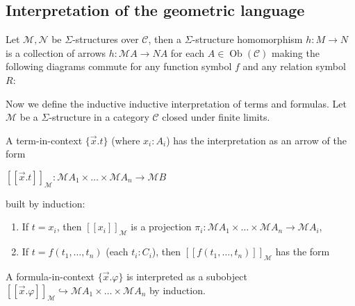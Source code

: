 \documentclass[a4paper]{article}
\theoremstyle{defin}
\theoremstyle{theorem}
\theoremstyle{claim}
\theoremstyle{prop}
\theoremstyle{lemma}
\theoremstyle{fact}
\theoremstyle{ex}
\theoremstyle{col}
\begin{document}
\subsection{Interpretation of the geometric language}

Let $\mathcal{M}, \mathcal{N}$ be $\Sigma$-structures over $\mathcal{C}$, then a $\Sigma$-structure homomorphism $h : M \to N$ is a collection of arrows $h : \mathcal{M} A \to N A$ for each $A \in \operatorname{Ob}(\mathcal{C})$ making the following diagrams commute for any function symbol $f$ and any relation symbol $R$:

\centerline{
}

Now we define the inductive inductive interpretation of terms and formulas. Let $\mathcal{M}$ be a $\Sigma$-structure in a category $\mathcal{C}$ closed under finite limits.

A term-in-context $\{ \vec{x}. t \}$ (where $x_i : A_i$) has the interpretation as an arrow of the form
\begin{center}
$[\![\vec{x}. t]\!]_{\mathcal{M}} : \mathcal{M} A_1 \times \dots \times \mathcal{M} A_n \to \mathcal{M} B$
\end{center}
built by induction:
\begin{enumerate}
\item If $t = x_i$, then $[\![x_i]\!]_{\mathcal{M}}$ is a projection $\pi_i : \mathcal{M} A_1 \times \dots \times \mathcal{M} A_n \to \mathcal{M} A_i$,
\item If $t = f(t_1, \dots, t_n)$ (each $t_i : C_i$), then $[\![f(t_1, \dots, t_n)]\!]_{\mathcal{M}}$ has the form

\centerline{
}
\end{enumerate}

A formula-in-context $\{ \vec{x}. \varphi \}$ is interpreted as a subobject $[\![\vec{x}. \varphi]\!]_{\mathcal{M}} \hookrightarrow \mathcal{M} A_1 \times \dots \times \mathcal{M} A_n$ by induction.
\end{document}
